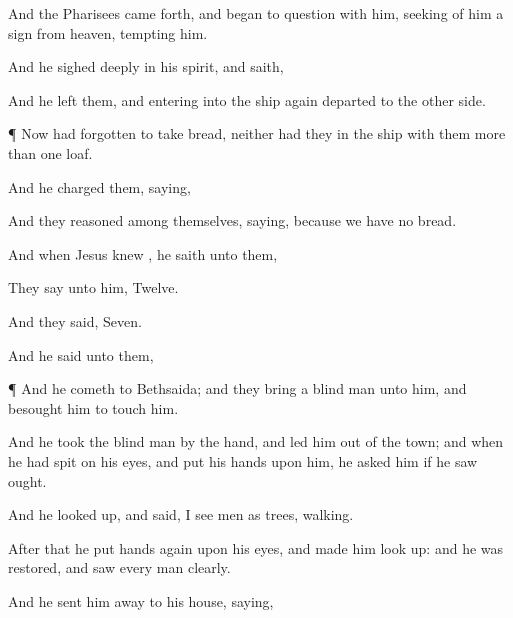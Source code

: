 {And the
Pharisees came
forth,
and
began to
question with
him,
seeking
of
him a
sign
from
heaven,
tempting
him.

And he sighed
deeply
in
his
spirit, and
saith,
{}

And he
left
them, and
entering
into the
ship
again
departed
to the other
side.


\par }{\PP {}¶
Now
{} had
forgotten to
take
bread,
neither had
they
in the
ship
with
them more than
one
loaf.

And he
charged
them,
saying,
{}

And they
reasoned
among
themselves,
saying,
{}
because we
have
no
bread.

And
when
Jesus
knew
{}, he
saith unto
them,
{}


 They
say unto
him,
Twelve.

And they
said,
Seven.

And he
said unto
them,
{}


\par }{\PP {}¶
And he
cometh
to
Bethsaida;
and they
bring a blind
man unto
him,
and
besought
him
to
touch
him.

And he
took the blind
man by the
hand, and
led
him out
of the
town;
and when he had
spit
on
his
eyes, and
put his
hands upon
him, he
asked
him
if he
saw
ought.

And he looked
up, and
said, I
see
men
as
trees,
walking.

After
that he
put
{}
hands
again
upon
his
eyes,
and
made
him look
up:
and he was
restored,
and
saw every
man
clearly.

And he
sent
him
away
to
his
house,
saying,
{}


}
